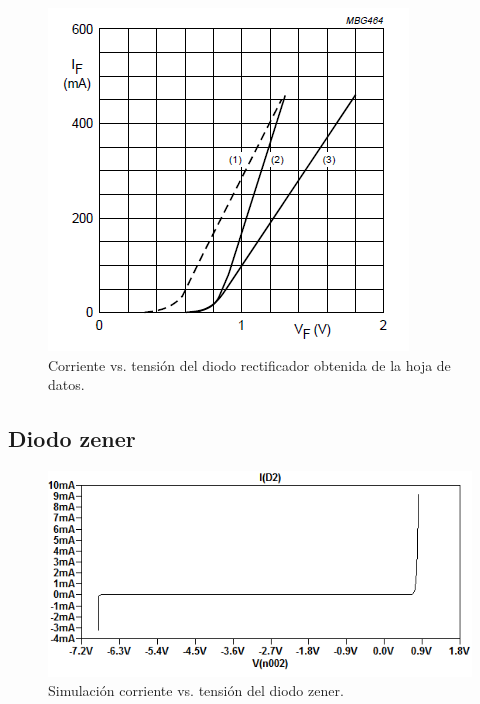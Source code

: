 \begin{figure}[!ht]
\centering
\includegraphics[scale=0.52]{../EJ1/DiodoRectificador/corrienteDiodoDatasheet}
\caption{Corriente vs. tensi\'on del diodo rectificador obtenida de la hoja de datos.}
\label{med1c}
\end{figure}

\subsection*{\color{orange}Diodo zener}

\begin{figure}[H]
\centering
\includegraphics[scale=0.62]{../EJ1/DiodoZener/simulacionZener}
\caption{Simulaci\'on corriente vs. tensi\'on del diodo zener.}
\label{med2a}
\end{figure}

